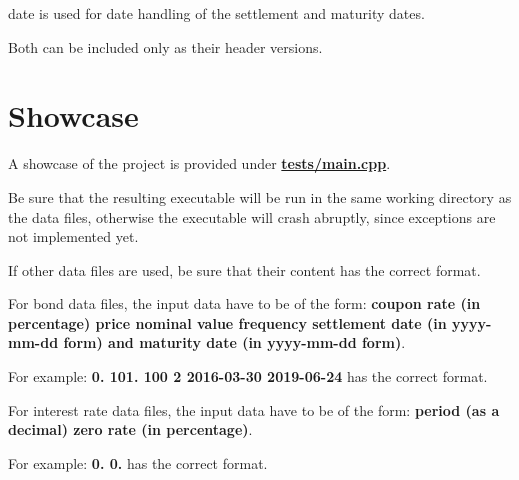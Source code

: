 date is used for date handling of the settlement and maturity dates.

Both can be included only as their header versions.\hypertarget{index_test_guide}{}\section{Showcase}\label{index_test_guide}
A showcase of the project is provided under {\bfseries \hyperlink{main_8cpp}{tests/main.\+cpp}}.

Be sure that the resulting executable will be run in the same working directory as the data files, otherwise the executable will crash abruptly, since exceptions are not implemented yet.

If other data files are used, be sure that their content has the correct format.

For bond data files, the input data have to be of the form\+: {\bfseries coupon rate (in percentage) price nominal value frequency settlement date (in yyyy-\/mm-\/dd form) and maturity date (in yyyy-\/mm-\/dd form)}.

For example\+: {\bfseries 0. 101. 100 2 2016-\/03-\/30 2019-\/06-\/24} has the correct format.

For interest rate data files, the input data have to be of the form\+: {\bfseries period (as a decimal) zero rate (in percentage)}.

For example\+: {\bfseries 0. 0.} has the correct format. 